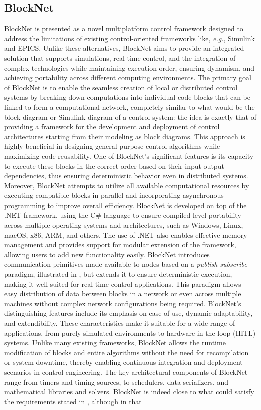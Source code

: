 \subsection{BlockNet}
\label{sec:related_work_blocknet}
BlockNet \cite{calacci_blocknet_2020} is presented as a novel multiplatform control framework designed to address the limitations of existing control-oriented frameworks like, \emph{e.g.}, Simulink and EPICS. Unlike these alternatives, BlockNet aims to provide an integrated solution that supports simulations, real-time control, and the integration of complex technologies while maintaining execution order, ensuring dynamism, and achieving portability across different computing environments. The primary goal of BlockNet is to enable the seamless creation of local or distributed control systems by breaking down computations into individual code blocks that can be linked to form a computational network, completely similar to what would be the block diagram or Simulink diagram of a control system: the idea is exactly that of providing a framework for the development and deployment of control architectures starting from their modeling as block diagrams. This approach is highly beneficial in designing general-purpose control algorithms while maximizing code reusability. One of BlockNet's significant features is its capacity to execute these blocks in the correct order based on their input-output dependencies, thus ensuring deterministic behavior even in distributed systems. Moreover, BlockNet attempts to utilize all available computational resources by executing compatible blocks in parallel and incorporating asynchronous programming to improve overall efficiency. BlockNet is developed on top of the .NET framework, using the C\# language to ensure compiled-level portability across multiple operating systems and architectures, such as Windows, Linux, macOS, x86, ARM, and others. The use of .NET also enables effective memory management and provides support for modular extension of the framework, allowing users to add new functionality easily. BlockNet introduces communication primitives made available to nodes based on a \emph{publish-subscribe} paradigm, illustrated in , but extends it to ensure deterministic execution, making it well-suited for real-time control applications. This paradigm allows easy distribution of data between blocks in a network or even across multiple machines without complex network configurations being required. BlockNet's distinguishing features include its emphasis on ease of use, dynamic adaptability, and extendibility. These characteristics make it suitable for a wide range of applications, from purely simulated environments to hardware-in-the-loop (HITL) systems. Unlike many existing frameworks, BlockNet allows the runtime modification of blocks and entire algorithms without the need for recompilation or system downtime, thereby enabling continuous integration and deployment scenarios in control engineering. The key architectural components of BlockNet range from timers and timing sources, to schedulers, data serializers, and mathematical libraries and solvers. BlockNet is indeed close to what could satisfy the requirements stated in , although in that 